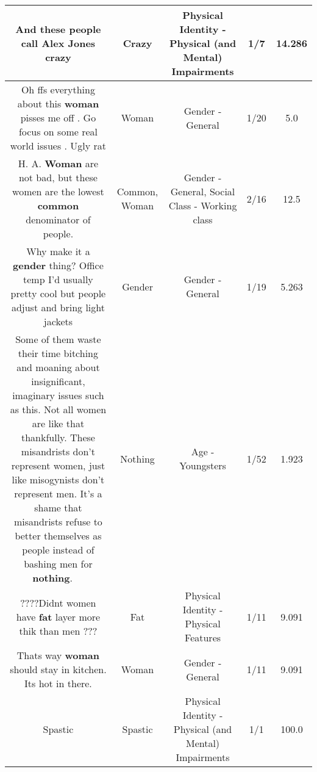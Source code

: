 \documentclass[11pt]{article}
\newlength\mylength
\begin{document}
\begin{center}
\begin{longtable}{|C{.65\mylength}|C{.30\mylength}|C{.12\mylength}|C{.12\mylength}|C{.12\mylength}|}
  \small And these people call Alex Jones crazy\normalsize   & Crazy & Physical Identity - Physical (and Mental) Impairments & 1/7 & 14.286 \\  \hline
  \small Oh ffs everything about this \textbf{woman} pisses me off . Go focus on some real world issues . Ugly rat\normalsize   & Woman & Gender - General & 1/20 & 5.0 \\  \hline
  \small H. A. \textbf{Woman} are not bad, but these women are the lowest \textbf{common} denominator of people.\normalsize   & Common, Woman & Gender - General, Social Class - Working class & 2/16 & 12.5 \\  \hline
  \small Why make it a \textbf{gender} thing? Office temp I'd usually pretty cool but people adjust and bring light jackets\normalsize   & Gender & Gender - General & 1/19 & 5.263 \\  \hline
  \small Some of them waste their time bitching and moaning about insignificant, imaginary issues such as this. Not all women are like that thankfully. These misandrists don't represent women, just like misogynists don't represent men. It's a shame that misandrists refuse to better themselves as people instead of bashing men for \textbf{nothing}. 🤦🏾‍♂️\normalsize   & Nothing & Age - Youngsters & 1/52 & 1.923 \\  \hline
  \small ????Didnt women have \textbf{fat} layer more thik than men ???\normalsize   & Fat & Physical Identity - Physical Features & 1/11 & 9.091 \\  \hline
  \small Thats way \textbf{woman} should stay in kitchen. Its hot in there.\normalsize   & Woman & Gender - General & 1/11 & 9.091 \\  \hline
  \small Spastic\normalsize   & Spastic & Physical Identity - Physical (and Mental) Impairments & 1/1 & 100.0 \\  \hline

\end{longtable}
\end{center}
\end{document}
